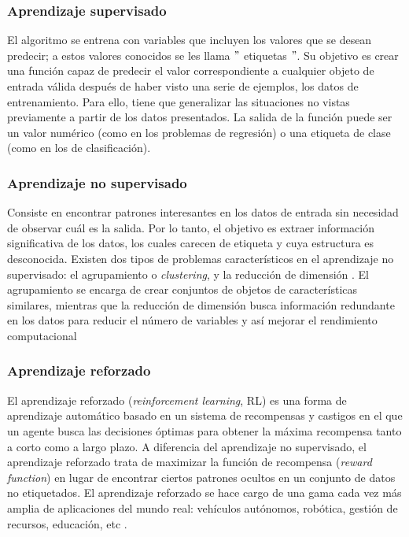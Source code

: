  \subsubsection{Aprendizaje supervisado}\label{1-MLsupervisado}
 El algoritmo se entrena con variables que incluyen los valores que se desean predecir; a estos valores conocidos se les llama $"$ etiquetas $"$. Su objetivo es crear una función capaz de predecir el valor correspondiente a cualquier objeto de entrada válida después de haber visto una serie de ejemplos, los datos de entrenamiento. Para ello, tiene que generalizar las situaciones no vistas previamente a partir de los datos presentados. La salida de la función puede ser un valor numérico (como en los problemas de regresión) o una etiqueta de clase (como en los de clasificación).
 
 \subsubsection{Aprendizaje no supervisado}\label{1-MLnosupervisado}
 
 Consiste en encontrar patrones interesantes en los datos de entrada sin necesidad de observar cuál es la salida.  Por lo tanto, el  objetivo es extraer información significativa de los datos, los cuales carecen de etiqueta y cuya estructura es desconocida. Existen dos tipos de problemas característicos en el aprendizaje no supervisado: el agrupamiento o \textit{clustering}, y la reducción de dimensión \cite{Chollet}. El agrupamiento se encarga de crear conjuntos de objetos de características similares, mientras que la reducción
 de dimensión busca información redundante en los datos para reducir el número de variables y así mejorar el rendimiento computacional
 
 \subsubsection{Aprendizaje reforzado}\label{1-RL}
 El aprendizaje reforzado (\textit{reinforcement learning}, RL) es una forma de aprendizaje automático basado en un sistema de recompensas y castigos en el que un agente busca las decisiones óptimas para obtener la máxima recompensa tanto a corto como a largo plazo. A diferencia del aprendizaje no supervisado, el aprendizaje reforzado trata de maximizar la función de recompensa (\textit{reward function}) en lugar de encontrar ciertos patrones ocultos en un conjunto de datos no etiquetados. El aprendizaje reforzado se hace cargo de una gama cada vez más amplia de aplicaciones del mundo real: vehículos autónomos, robótica, gestión de recursos, educación, etc \cite{Chollet}.\\
 
